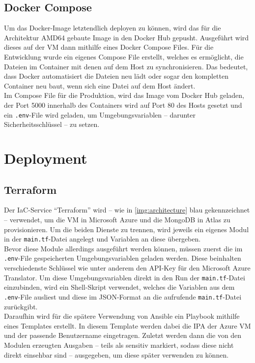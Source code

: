 \subsection{Docker Compose}\label{c:3_ss:docker-compose}
Um das Docker-Image letztendlich deployen zu können, wird das für die Architektur AMD64 gebaute Image in den Docker Hub gepusht. Ausgeführt wird dieses auf der \ac{VM} dann mithilfe eines Docker Compose Files. Für die Entwicklung wurde ein eigenes Compose File erstellt, welches es ermöglicht, die Dateien im Container mit denen auf dem Host zu synchronisieren. Das bedeutet, dass Docker automatisiert die Dateien neu lädt oder sogar den kompletten Container neu baut, wenn sich eine Datei auf dem Host ändert.\\
Im Compose File für die Produktion, wird das Image vom Docker Hub geladen, der Port 5000 innerhalb des Containers wird auf Port 80 des Hosts gesetzt und ein \lstinline{.env}-File wird geladen, um Umgebungsvariablen -- darunter Sicherheitsschlüssel -- zu setzen.


\section{Deployment}\label{c:3_s:deployment}

\subsection{Terraform}\label{c:3_ss:terraform}
Der \ac{IaC}-Service \enquote{Terraform} wird -- wie in \autoref{img:architecture} blau gekennzeichnet -- verwendet, um die \ac{VM} in Microsoft Azure und die MongoDB in Atlas zu provisionieren. Um die beiden Dienste zu trennen, wird jeweils ein eigenes Modul in der \lstinline{main.tf}-Datei angelegt und Variablen an diese übergeben.\\
Bevor diese Module allerdings ausgeführt werden können, müssen zuerst die im \lstinline{.env}-File gespeicherten Umgebungsvariablen geladen werden. Diese beinhalten verschiedenste Schlüssel wie unter anderem den \ac{API}-Key für den Microsoft Azure Translator. Um diese Umgebungsvariablen direkt in den Run der \lstinline{main.tf}-Datei einzubinden, wird ein Shell-Skript verwendet, welches die Variablen aus dem \lstinline{.env}-File ausliest und diese im \ac{JSON}-Format an die aufrufende \lstinline{main.tf}-Datei zurückgibt.\\
Daraufhin wird für die spätere Verwendung von Ansible ein Playbook mithilfe eines Templates erstellt. In diesem Template werden dabei die \ac{IPA} der Azure \ac{VM} und der passende Benutzername eingetragen. Zuletzt werden dann die von den Modulen erzeugten Ausgaben -- teils als sensitiv markiert, sodass diese nicht direkt einsehbar sind -- ausgegeben, um diese später verwenden zu können.

